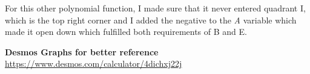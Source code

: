 \documentclass[pstricks,border=11pt]{article}
\begin{document}
\vspace{5mm}
\begin{center}
\end{center}
\vspace{5mm}

For this other polynomial function, I made sure that it never entered quadrant I, which is the top right corner and I added the negative to the \textit{A} variable which made it open down which fulfilled both requirements of B and E.

\vfill
\hfill \break
\textbf{Desmos Graphs for better reference}
\hfill \break
\url{https://www.desmos.com/calculator/4dichxj22j}
\end{document}
